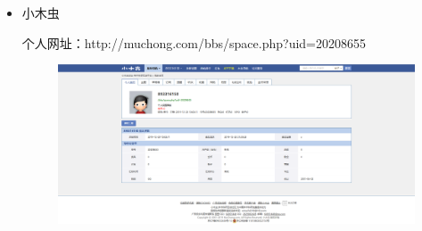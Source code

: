 \documentclass{article}
\begin{document}
\begin{itemize}
\begin{figure}[h!]
	\label{fig:cnblogs}
\end{figure}
    \item 小木虫\par
    个人网址：http://muchong.com/bbs/space.php?uid=20208655\par
     \begin{figure}[h!]
    	\centering
    	\includegraphics[scale=0.2]{xmc}
    	\label{fig:xmc}
    \end{figure}
\end{itemize}


\hspace*{\fill} \\



\end{document}

